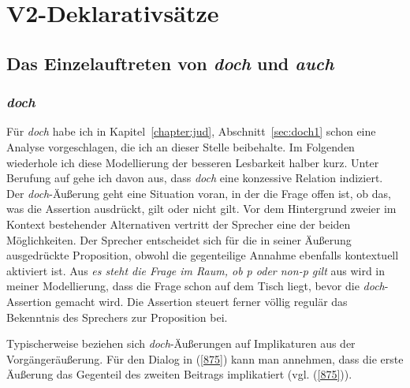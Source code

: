 {\section{V2-Deklarativsätze}
\label{sec:V2}
\subsection{Das Einzelauftreten von \textit{doch} und \textit{auch}}
\subsubsection{\textit{doch}}
\label{sec:doch}
Für \textit{doch} habe ich in Kapitel~\ref{chapter:jud}, Abschnitt~\ref{sec:doch1} schon eine Analyse vorgeschlagen, die ich an dieser Stelle beibehalte. Im Folgenden wiederhole ich diese Modellierung der besseren Lesbarkeit halber kurz. Unter Berufung auf \citet{Diewald1998} gehe ich davon aus, dass \textit{doch} eine konzessive Relation indiziert. Der \textit{doch}-Äußerung geht eine Situation voran, in der die Frage offen ist, ob das, was die Assertion ausdrückt, gilt oder nicht gilt. Vor dem Hintergrund zweier im Kontext bestehender Alternativen vertritt der Sprecher eine der beiden Möglichkeiten. Der Sprecher entscheidet sich für die in seiner Äußerung ausgedrückte Proposition, obwohl die gegenteilige Annahme ebenfalls kontextuell aktiviert ist. Aus \textit{es steht die Frage im Raum, ob p oder non-p gilt}  aus \citet{Diewald1998} wird in meiner Modellierung, dass die Frage schon auf dem Tisch liegt, bevor die \textit{doch}-Assertion gemacht wird. Die Assertion steuert ferner völlig regulär das Bekenntnis des Sprechers zur Proposition bei.

Typischerweise beziehen sich \textit{doch}-Äußerungen auf Implikaturen  aus der Vor\-gängeräußerung. Für den Dialog in (\ref{875}) kann man annehmen, dass die erste Äußerung das Gegenteil des zweiten Beitrags implikatiert (vgl. (\ref{875})).

}
